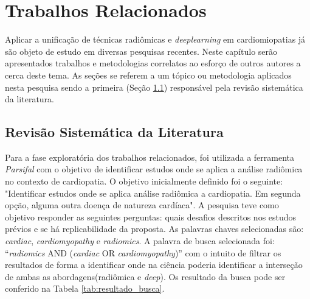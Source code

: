 \chapter{Trabalhos Relacionados} 
\label{chap:trab_relacionados}


Aplicar a unificação de técnicas radiômicas e \textit{deeplearning} em cardiomiopatias já são objeto de estudo em diversas pesquisas recentes.
Neste capítulo serão apresentados trabalhos e metodologias correlatos ao esforço de outros autores a cerca deste tema. As seções se referem a um tópico ou metodologia aplicados nesta pesquisa sendo a primeira (Seção \ref{sec:rev_sistematica}) responsável pela revisão sistemática da literatura.

\section{Revisão Sistemática da Literatura} 
\label{sec:rev_sistematica}

Para a fase exploratória dos trabalhos relacionados, foi utilizada a ferramenta \textit{Parsifal} com o objetivo de identificar estudos onde se aplica a análise radiômica no contexto de cardiopatia. O objetivo inicialmente definido foi o seguinte: "Identificar estudos onde se aplica análise radiômica a cardiopatia. Em segunda opção, alguma outra doença de natureza cardíaca". A pesquisa teve como objetivo responder as seguintes perguntas: quais desafios descritos nos estudos prévios e se há replicabilidade da proposta. As palavras chaves selecionadas são: \textit{cardiac}, \textit{cardiomyopathy} e \textit{radiomics}. A palavra de busca selecionada foi: ``\textit{radiomics} AND (\textit{cardiac} OR \textit{cardiomyopathy})'' com o intuito de filtrar os resultados de forma a identificar onde na ciência poderia identificar a interseção de ambas as abordagens(radiômica e \textit{deep}). Os resultado da busca pode ser conferido na Tabela \ref{tab:resultado_busca}. 

